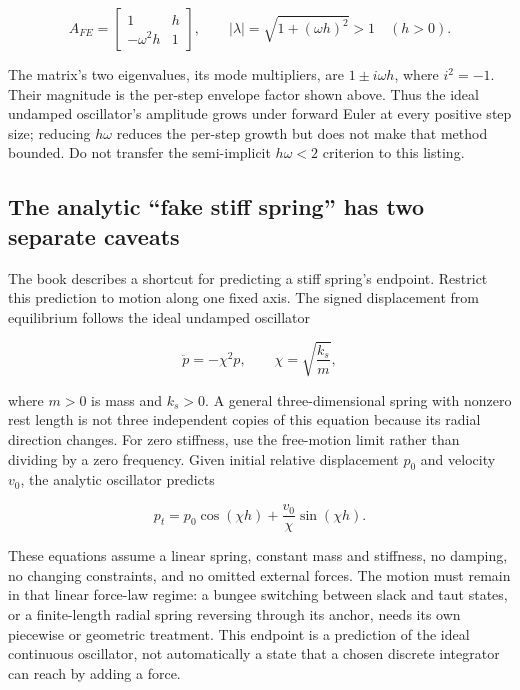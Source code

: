 \[
A_{FE}=\begin{bmatrix}1&h\\-\omega^2h&1\end{bmatrix},
\qquad |\lambda|=\sqrt{1+(\omega h)^2}>1\quad(h>0).
\]

The matrix's two eigenvalues, its mode multipliers, are \(1\pm i\omega h\), where \(i^2=-1\). Their magnitude is the per-step envelope factor shown above. Thus the ideal undamped oscillator's amplitude grows under forward Euler at every positive step size; reducing \(h\omega\) reduces the per-step growth but does not make that method bounded. Do not transfer the semi-implicit \(h\omega<2\) criterion to this listing.

\subsection{The analytic ``fake stiff spring'' has two separate caveats}\label{06-engine-ii-ch047-the-analytic-fake-stiff-spring-has-two-separate-caveats}

\hypertarget{06-engine-ii-ch047-the-analytic-fake-stiff-spring-has-two-separate-caveats}{}

The book describes a shortcut for predicting a stiff spring's endpoint. Restrict this prediction to motion along one fixed axis. The signed displacement from equilibrium follows the ideal undamped oscillator

\[
\ddot p=-\chi^2p,\qquad \chi=\sqrt{\frac{k_s}{m}},
\]

where \(m>0\) is mass and \(k_s>0\). A general three-dimensional spring with nonzero rest length is not three independent copies of this equation because its radial direction changes. For zero stiffness, use the free-motion limit rather than dividing by a zero frequency. Given initial relative displacement \(p_0\) and velocity \(v_0\), the analytic oscillator predicts

\[
p_t=p_0\cos(\chi h)+\frac{v_0}{\chi}\sin(\chi h).
\]

These equations assume a linear spring, constant mass and stiffness, no damping, no changing constraints, and no omitted external forces. The motion must remain in that linear force-law regime: a bungee switching between slack and taut states, or a finite-length radial spring reversing through its anchor, needs its own piecewise or geometric treatment. This endpoint is a prediction of the ideal continuous oscillator, not automatically a state that a chosen discrete integrator can reach by adding a force.

